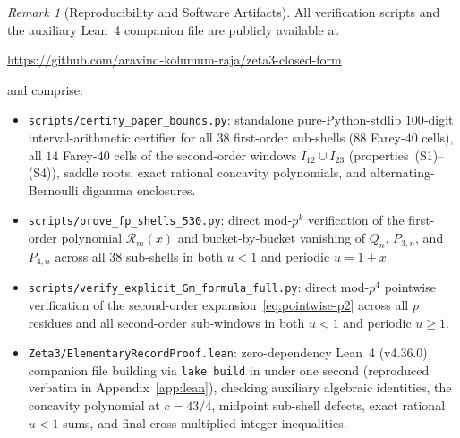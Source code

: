\documentclass[11pt,reqno]{amsart}
\theoremstyle{definition}
\theoremstyle{remark}
\newtheorem{remark}[theorem]{Remark}
\begin{document}
\begin{remark}[Reproducibility and Software Artifacts]
All verification scripts and the auxiliary Lean~4 companion file are publicly available at
\begin{center}
  \url{https://github.com/aravind-kolumum-raja/zeta3-closed-form}
\end{center}
and comprise:
\begin{itemize}
  \item \texttt{scripts/\allowbreak certify\_\allowbreak paper\_\allowbreak bounds.py}: standalone pure-Python-stdlib $100$-digit interval-arithmetic certifier for all $38$ first-order sub-shells ($88$ Farey-$40$ cells), all $14$ Farey-$40$ cells of the second-order windows $I_{12} \cup I_{23}$ (properties~(S1)--(S4)), saddle roots, exact rational concavity polynomials, and alternating-Bernoulli digamma enclosures.
  \item \texttt{scripts/prove\_fp\_shells\_530.py}: direct mod-$p^k$ verification of the first-order polynomial $\mathcal{R}_m(x)$ and bucket-by-bucket vanishing of $Q_n$, $P_{3,n}$, and $P_{4,n}$ across all $38$ sub-shells in both $u < 1$ and periodic $u = 1 + x$.
  \item \texttt{scripts/verify\_explicit\_Gm\_formula\_full.py}: direct mod-$p^4$ pointwise verification of the second-order expansion~\eqref{eq:pointwise-p2} across all $p$ residues and all second-order sub-windows in both $u < 1$ and periodic $u \ge 1$.
  \item \texttt{Zeta3/ElementaryRecordProof.lean}: zero-dependency Lean~4 (v4.36.0) companion file building via \texttt{lake build} in under one second (reproduced verbatim in Appendix~\ref{app:lean}), checking auxiliary algebraic identities, the concavity polynomial at $c = 43/4$, midpoint sub-shell defects, exact rational $u < 1$ sums, and final cross-multiplied integer inequalities.
\end{itemize}
\end{remark}
\end{document}
